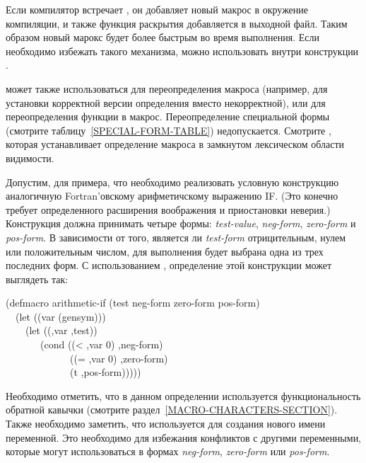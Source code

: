 \begin{defmac}
Если компилятор встречает , он добавляет новый макрос в окружение
компиляции, и также функция раскрытия добавляется в выходной файл. Таким образом
новый марокс будет более быстрым во время выполнения.
Если необходимо избежать такого механизма, можно использовать 
внутри конструкции .

 может также использоваться для переопределения макроса
(например, для установки корректной версии определения вместо некорректной), или
для переопределения функции в макрос.
Переопределение специальной формы (смотрите таблицу~\ref{SPECIAL-FORM-TABLE})
недопускается.
Смотрите , которая устанавливает определение макроса в замкнутом
лексическом области видимости.

Допустим, для примера, что необходимо реализовать условную конструкцию
аналогичную Fortran'овскому арифметичскому выражению IF. (Это конечно требует
определенного расширения воображения и приостановки неверия.)
Конструкция должна принимать четыре формы:
\emph{test-value},
\emph{neg-form},
\emph{zero-form} и
\emph{pos-form}.
В зависимости от того, является ли \emph{test-form} отрицительным, нулем или
положительным числом, для выполнения будет выбрана одна из трех последних форм.
С использованием , определение этой конструкции может выглядеть
так:
\begin{lisp}
(defmacro arithmetic-if (test neg-form zero-form pos-form) \\
~~(let ((var (gensym))) \\
~~~~{\Xbq}(let ((,var ,test)) \\
~~~~~~~(cond ((< ,var 0) ,neg-form) \\
~~~~~~~~~~~~~((= ,var 0) ,zero-form) \\
~~~~~~~~~~~~~(t ,pos-form)))))
\end{lisp}
Необходимо отметить, что в данном определении используется функциональность
обратной кавычки (смотрите раздел~\ref{MACRO-CHARACTERS-SECTION}).
Также необходимо заметить, что используется  для создания нового
имени переменной.
Это необходимо для избежания конфликтов с другими переменными, которые могут
использоваться в формах \emph{neg-form}, \emph{zero-form} или \emph{pos-form}.


\end{defmac}
